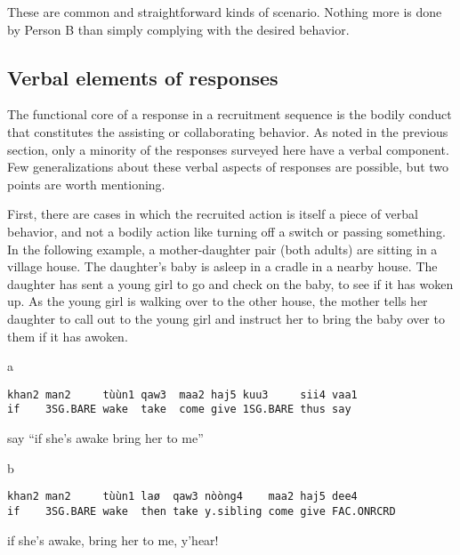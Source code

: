 \documentclass[output=paper]{langsci/langscibook}
\begin{document}
These are common and straightforward kinds of scenario. Nothing more is done by Person B than simply complying with the desired behavior.

\subsection{Verbal elements of responses}

The functional core of a response in a recruitment sequence is the bodily conduct that constitutes the assisting or collaborating behavior. As noted in the previous section, only a minority of the responses surveyed here have a verbal component. Few generalizations about these verbal aspects of responses are possible, but two points are worth mentioning.

First, there are cases in which the recruited action is itself a piece of verbal behavior, and not a bodily action like turning off a switch or passing something. In the following example, a mother-daughter pair (both adults) are sitting in a village house. The daughter’s baby is asleep in a cradle in a nearby house. The daughter has sent a young girl to go and check on the baby, to see if it has woken up. As the young girl is walking over to the other house, the mother tells her daughter to call out to the young girl and instruct her to bring the baby over to them if it has awoken.

\vspace{-1mm}
%
\begin{mdframednoverticalspace}[style=firstfoc]
\begin{transbox}{1}{a}
\begin{verbatim}
khan2 man2     tùùn1 qaw3  maa2 haj5 kuu3     sii4 vaa1
if    3SG.BARE wake  take  come give 1SG.BARE thus say
\end{verbatim}
say “if she’s awake bring her to me” 
\end{transbox}
\end{mdframednoverticalspace}
%
%
\begin{mdframednoverticalspace}[style=secondfoc]
\begin{transbox}{2}{b}
\begin{verbatim}
khan2 man2     tùùn1 laø  qaw3 nòòng4    maa2 haj5 dee4
if    3SG.BARE wake  then take y.sibling come give FAC.ONRCRD
\end{verbatim}
if she’s awake, bring her to me, y’hear!
\end{transbox}
\end{mdframednoverticalspace}
%
\\
\end{document}
